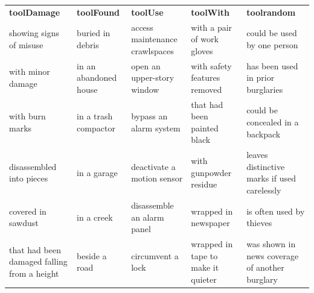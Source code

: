 \documentclass{article}
\begin{document}
\begin{landscape}
\begin{table}[]
\begin{tabular}{lllll}
\textbf{toolDamage}                         & \textbf{toolFound}    & \textbf{toolUse}               & \textbf{toolWith}                  & \textbf{toolrandom}                            \\
showing signs of misuse                     & buried in debris      & access maintenance crawlspaces & with a pair of work gloves         & could be used by one person                    \\
with minor damage                           & in an abandoned house & open an upper-story window     & with safety features removed       & has been used in prior burglaries \\
with burn marks                             & in a trash compactor  & bypass an alarm system         & that had been painted black        & could be concealed in a backpack               \\
disassembled into pieces & in a garage           & deactivate a motion sensor     & with gunpowder residue             & leaves distinctive marks if used carelessly    \\
covered in sawdust  & in a creek            & disassemble an alarm panel     & wrapped in newspaper               & is often used by thieves                       \\
\begin{minipage}[t]{0.15\columnwidth}that had been damaged falling from a height\end{minipage}                    & beside a road         & circumvent a lock              & wrapped in tape to make it quieter & \begin{minipage}[t]{0.25\columnwidth}was shown in news coverage of another burglary  \end{minipage}      
\end{tabular}
\end{table}

\end{landscape}
\restoregeometry
\end{document}
